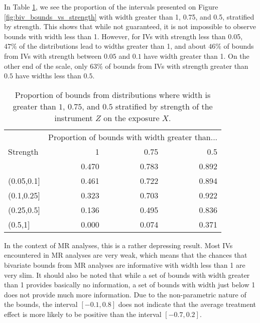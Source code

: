 \documentclass[
]{article}
\theoremstyle{plain}
\begin{document}
In Table \ref{tab:prop_of_biv_widths_large}, we see the proportion of the intervals presented on Figure \ref{fig:biv_bounds_vs_strength} with width greater than 1, 0.75, and 0.5, stratified by strength. This shows that while not guaranteed, it is not impossible to observe bounds with width less than 1. However, for IVs with strength less than 0.05, \(47\%\) of the distributions lead to widths greater than 1, and about \(46\%\) of bounds from IVs with strength between \(0.05\) and \(0.1\) have width greater than 1. On the other end of the scale, only \(63\%\) of bounds from IVs with strength greater than \(0.5\) have widths less than \(0.5\).

\begin{table}[H]
  \begin{center}
  
\begin{tabular}{l|r|r|r}
\hline
\multicolumn{1}{c|}{ } & \multicolumn{3}{c}{Proportion of bounds with width greater than...} \\
\cline{2-4}
Strength & 1 & 0.75 & 0.5\\
\hline
[0,0.05] & 0.470 & 0.783 & 0.892\\
\hline
(0.05,0.1] & 0.461 & 0.722 & 0.894\\
\hline
(0.1,0.25] & 0.323 & 0.703 & 0.922\\
\hline
(0.25,0.5] & 0.136 & 0.495 & 0.836\\
\hline
(0.5,1] & 0.000 & 0.074 & 0.371\\
\hline
\end{tabular}


  \caption{Proportion of bounds from distributions where width is greater than $1$, $0.75$, and $0.5$ stratified by strength of the instrument $Z$ on the exposure $X$.}
  \label{tab:prop_of_biv_widths_large}
  \end{center}
\end{table}

In the context of MR analyses, this is a rather depressing result. Most IVs encountered in MR analyses are very weak, which means that the chances that bivariate bounds from MR analyses are informative with width less than 1 are very slim. It should also be noted that while a set of bounds with width greater than 1 provides basically no information, a set of bounds with width just below 1 does not provide much more information. Due to the non-parametric nature of the bounds, the interval \([-0.1, 0.8]\) does not indicate that the average treatment effect is more likely to be positive than the interval \([-0.7, 0.2]\).
\end{document}
